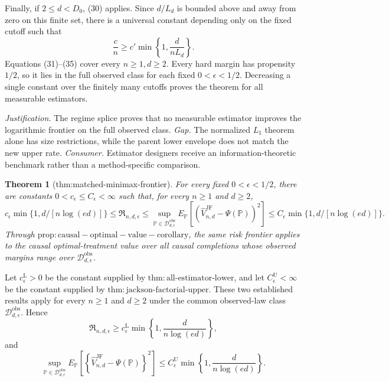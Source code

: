 \documentclass{article}
\newtheorem{theorem}{Theorem}
\begin{document}
Finally, if \(2\leq d<D_0\), (30) applies.  Since \(d/L_d\) is bounded above and away from zero on this finite set, there is a universal constant depending only on the fixed cutoff such that
\[
 \frac cn\geq c'\min\left\{1,\frac d{nL_d}\right\}.              \tag{35}
\]
Equations (31)--(35) cover every \(n\geq1,d\geq2\).  Every hard margin has propensity \(1/2\), so it lies in the full observed class for each fixed \(0<\epsilon<1/2\).  Decreasing a single constant over the finitely many cutoffs proves the theorem for all measurable estimators.
\par\smallskip\noindent \textit{Justification.} The regime splice proves that no measurable estimator improves the logarithmic frontier on the full observed class. \textit{Gap.} The normalized \(L_1\) theorem alone has size restrictions, while the parent lower envelope does not match the new upper rate. \textit{Consumer.} Estimator designers receive an information-theoretic benchmark rather than a method-specific comparison.

\begin{theorem}[thm:matched-minimax-frontier]\label{thm:matched-minimax-frontier}
For every fixed \(0<\epsilon<1/2\), there are constants \(0<c_\epsilon\leq C_\epsilon<\infty\) such that, for every \(n\geq1\) and \(d\geq2\),
\[
c_\epsilon\min\{1,d/[n\log(ed)]\}\leq\mathfrak R_{n,d,\epsilon}
\leq\sup_{\mathbb P\in\mathcal D_{d,\epsilon}^{\mathrm{obs}}}E_{\mathbb P}[(\widehat V_{n,d}^{\mathrm{JF}}-\Psi(\mathbb P))^2]
\leq C_\epsilon\min\{1,d/[n\log(ed)]\}.
\]
Through \(\mathrm{prop:causal-optimal-value-corollary}\), the same risk frontier applies to the causal optimal-treatment value over all causal completions whose observed margins range over \(\mathcal D_{d,\epsilon}^{\mathrm{obs}}\).
\end{theorem}
Let \(c_{\epsilon}^{\mathrm L}>0\) be the constant supplied by \(\mathrm{thm:all\mbox{-}estimator\mbox{-}lower}\), and let \(C_{\epsilon}^{\mathrm U}<\infty\) be the constant supplied by \(\mathrm{thm:jackson\mbox{-}factorial\mbox{-}upper}\).  These two established results apply for every \(n\geq1\) and \(d\geq2\) under the common observed-law class \(\mathcal D_{d,\epsilon}^{\mathrm{obs}}\).  Hence
\[
 \mathfrak R_{n,d,\epsilon}
 \geq c_{\epsilon}^{\mathrm L}
 \min\!\left\{1,\frac{d}{n\log(ed)}\right\},                                      \tag{1}
\]
and
\[
 \sup_{\mathbb P\in\mathcal D_{d,\epsilon}^{\mathrm{obs}}}
 E_{\mathbb P}\!\left[
 \left\{\widehat V_{n,d}^{\mathrm{JF}}-\Psi(\mathbb P)\right\}^{2}
 \right]
 \leq C_{\epsilon}^{\mathrm U}
 \min\!\left\{1,\frac{d}{n\log(ed)}\right\}.                                      \tag{2}
\]
\end{document}
